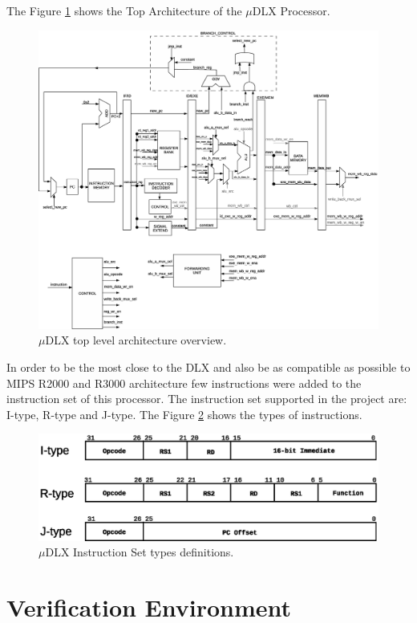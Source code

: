 \documentclass{article}
\begin{document}
The Figure \ref{fig:top_architecture} shows the Top Architecture of the $\mu$DLX Processor.	

\begin{landscape}
    \begin{figure}[H]
      \centering
      \includegraphics[width=.7\linewidth]{../architecture/pictures/top_architecture.eps}
    	\caption{$\mu$DLX top level architecture overview.}
    	\label{fig:top_architecture}       
    \end{figure}
  \end{landscape}	
	
	In order to be the most close to the DLX and also be as compatible as possible to MIPS R2000 and R3000 architecture few instructions were added to the instruction set of this processor. The instruction set supported in the project are: I-type, R-type and J-type. The Figure \ref{fig:isa} shows the types of instructions.
	
	\begin{figure}[H]
    	\centering
    	\includegraphics[width=\linewidth]{../architecture/pictures/instruction_set.eps}
    	\caption{$\mu$DLX Instruction Set types definitions.}
    	\label{fig:isa}       	
  	\end{figure} 
  	
	\newpage
	\section{Verification Environment}
	
\end{document}
